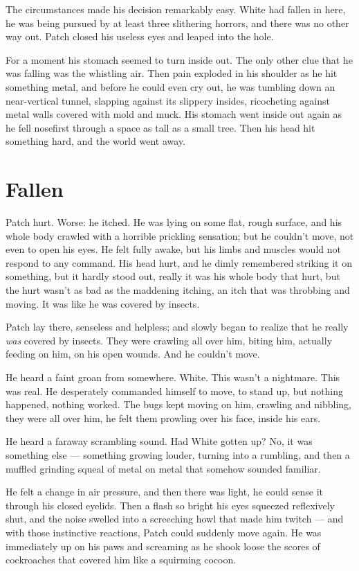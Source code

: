 \documentclass[12pt]{book}
\begin{document}
The circumstances made his decision remarkably easy. White had fallen in here, he was being pursued by at least three slithering horrors, and there was no other way out. Patch closed his useless eyes and leaped into the hole.

For a moment his stomach seemed to turn inside out. The only other clue that he was falling was the whistling air. Then pain exploded in his shoulder as he hit something metal, and before he could even cry out, he was tumbling down an near-vertical tunnel, slapping against its slippery insides, ricocheting against metal walls covered with mold and muck. His stomach went inside out again as he fell nosefirst through a space as tall as a small tree. Then his head hit something hard, and the world went away.


\section{Fallen}

Patch hurt. Worse: he itched. He was lying on some flat, rough surface, and his whole body crawled with a horrible prickling sensation; but he couldn't move, not even to open his eyes. He felt fully awake, but his limbs and muscles would not respond to any command. His head hurt, and he dimly remembered striking it on something, but it hardly stood out, really it was his whole body that hurt, but the hurt wasn't as bad as the maddening itching, an itch that was throbbing and moving. It was like he was covered by insects.

Patch lay there, senseless and helpless; and slowly began to realize that he really {\it was} covered by insects. They were crawling all over him, biting him, actually feeding on him, on his open wounds. And he couldn't move.

He heard a faint groan from somewhere. White. This wasn't a nightmare. This was real. He desperately commanded himself to move, to stand up, but nothing happened, nothing worked. The bugs kept moving on him, crawling and nibbling, they were all over him, he felt them prowling over his face, inside his ears.

He heard a faraway scrambling sound. Had White gotten up? No, it was something else ---
something growing louder, turning into a rumbling, and then a muffled grinding squeal of metal on metal that somehow sounded familiar.

He felt a change in air pressure, and then there was light, he could sense it through his closed eyelids. Then a flash so bright his eyes squeezed reflexively shut, and the noise swelled into a screeching howl that made him twitch ---
and with those instinctive reactions, Patch could suddenly move again. He was immediately up on his paws and screaming as he shook loose the scores of cockroaches that covered him like a squirming cocoon.
\end{document}
